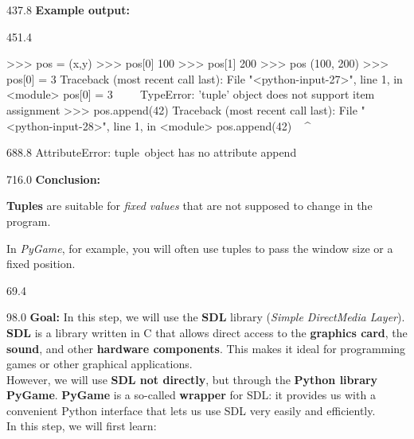 \documentclass{aslab}
\newcommand*\codexi[1]{\fontsize{11bp}{#1bp}\ttfamily\lineskiplimit=-\maxdimen}
\begin{document}
\begin{region}[x=74.7,right=0]{437.8}
\textbf{Example output:}
\end{region}

\begin{region}[x=74.7,right=0,pitch=13.2]{451.4}
\begin{codeblock}[basicstyle=\codexi{13.2}]
>>> pos = (x,y)
>>> pos[0]
100
>>> pos[1]
200
>>> pos
(100, 200)
>>> pos[0] = 3
Traceback (most recent call last):
  File "<python-input-27>", line 1, in <module>
    pos[0] = 3
    ~~~^^^
TypeError: 'tuple' object does not support item assignment
>>> pos.append(42)
Traceback (most recent call last):
  File "<python-input-28>", line 1, in <module>
    pos.append(42)
    ^^^^^^^^^^
\end{codeblock}
\end{region}

\begin{region}[x=74.7,right=0]{688.8}
AttributeError: \textquotesingle tuple\textquotesingle\ object has no attribute \textquotesingle append\textquotesingle
\end{region}

\begin{region}[pitch=14.35]{716.0}
\textbf{Conclusion:}
\begin{dashlist}
\item \textbf{Tuples} are suitable for \emph{fixed values} that are not
  supposed to change in the program.
\item In \emph{PyGame}, for example, you will often use tuples to pass the
  window size or a fixed position.
\end{dashlist}
\end{region}

\nextpage
\begin{region}{69.4}
\end{region}

\begin{region}[pitch=13.83]{98.0}
\textbf{Goal:} In this step, we will use the \textbf{SDL} library
(\emph{Simple DirectMedia Layer}).\\
\textbf{SDL} is a library written in C that allows direct access to the
\textbf{graphics card}, the \textbf{sound}, and other \textbf{hardware
components}. This makes it ideal for programming games or other graphical
applications.\\
However, we will use \textbf{SDL not directly}, but through the
\textbf{Python library PyGame}. \textbf{PyGame} is a so-called
\textbf{wrapper} for SDL: it provides us with a convenient Python interface
that lets us use SDL very easily and efficiently.\\
In this step, we will first learn:
\end{region}
\end{document}
